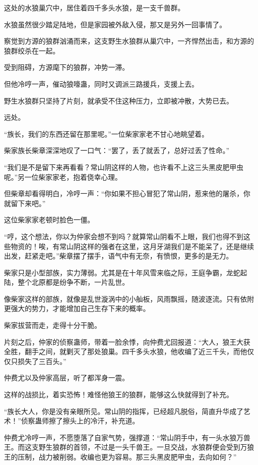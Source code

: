
\begin{this_body}

这处的水狼巢穴中，居住着四千多头水狼，是一支千兽群。

水狼虽然很少踏足陆地，但是家园被外敌入侵，那又是另外一回事情了。

察觉到方源的狼群汹涌而来，这支野生水狼群从巢穴中，一齐悍然出击，和方源的狼群绞杀在一起。

受到阻碍，方源麾下的狼群，冲势一滞。

但他冷哼一声，催动狼嚎蛊，同时又调派三路援兵，支援上去。

野生水狼群只坚持了片刻，就承受不住这种压力，立即被冲散，大势已去。

远处。

“族长，我们的东西还留在那里呢。”一位柴家家老不甘心地眺望着。

柴家族长柴章深深地叹了一口气：“罢了，丢了就丢了，总好过丢了性命。”

“我们是不是留下来再看看？常山阴这样的人物，也许看不上这三头黑皮肥甲虫呢。”另一位柴家家老，抱着侥幸心理。

但柴章却看得明白，冷哼一声：“你如果不担心冒犯了常山阴，惹来他的屠杀，你就留下来吧。”

这位柴家家老顿时脸色一僵。

“哼，这个想法，你以为仲家会想不到吗？就算常山阴看不上眼，我们也得不到这些物资的！唉，有常山阴这样的强者在这里，这月牙湖我们是不能呆了，还是继续出发，赶紧走吧。”柴章摆了摆手，语气中有无奈，有愤恨，更多的是无力。

柴家只是小型部族，实力薄弱。尤其是在十年风雪来临之际，王庭争霸，龙蛇起陆，整个北原都是纷争不断，一片乱世。

像柴家这样的部族，就像是乱世漩涡中的小舢板，风雨飘摇，随波逐流。只有依附更强大的势力，才能增加自己生存下来的概率。

柴家拔营而走，走得十分干脆。

片刻之后，仲家的侦察蛊师，带着一脸余悸，向仲费尤回报道：“大人，狼王大获全胜，翻手之间，就剿灭了那处狼巢。四千多头水狼，他收编了近三千头，而他仅仅只损失了三百头。”

仲费尤以及仲家高层，听了都浑身一震。

这样的战损比，着实恐怖！难怪他狼王的狼群，能够这么快就得到了补充。

“族长大人，你是没有亲眼所见。常山阴的指挥，已经超凡脱俗，简直升华成了艺术！”侦察蛊师擦了擦头上的冷汗，补充道。

仲费尤冷哼一声，不愿堕落了自家气势，强撑道：“常山阴手中，有一头水狼万兽王。而这支野生狼群的首领，不过是一头千兽王。一旦交战，水狼群便会受到万狼王的压制，战力被削弱。收编也更为容易。那三头黑皮肥甲虫，去向如何？”


\end{this_body}
